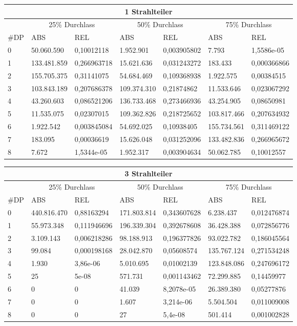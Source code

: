 \begin{tabular}{|l|l|l|l|l|l|l|}
	\hline
	\multicolumn{7}{|c|}{1 Strahlteiler} \\\hline
	&\multicolumn{2}{|c|}{25\% Durchlass}&\multicolumn{2}{c|}{50\% Durchlass}&\multicolumn{2}{c|}{75\% Durchlass}\\\hline
	\#DP & ABS & REL  & ABS & REL & ABS & REL \\\hline
	0&50.060.590&0,10012118&1.952.901&0,003905802&7.793&1,5586e-05\\
	1&133.481.859&0,266963718&15.621.636&0,031243272&183.433&0,000366866\\
	2&155.705.375&0,31141075&54.684.469&0,109368938&1.922.575&0,00384515\\
	3&103.843.189&0,207686378&109.374.310&0,21874862&11.533.646&0,023067292\\
	4&43.260.603&0,086521206&136.733.468&0,273466936&43.254.905&0,08650981\\
	5&11.535.075&0,02307015&109.362.826&0,218725652&103.817.466&0,207634932\\
	6&1.922.542&0,003845084&54.692.025&0,10938405&155.734.561&0,311469122\\
	7&183.095&0,00036619&15.626.048&0,031252096&133.482.836&0,266965672\\
	8&7.672&1,5344e-05&1.952.317&0,003904634&50.062.785&0,10012557\\
	\hline
\end{tabular}

\begin{tabular}{|l|l|l|l|l|l|l|}
	\hline
	\multicolumn{7}{|c|}{3 Strahlteiler} \\\hline
	&\multicolumn{2}{|c|}{25\% Durchlass}&\multicolumn{2}{c|}{50\% Durchlass}&\multicolumn{2}{c|}{75\% Durchlass}\\\hline
	\#DP & ABS & REL  & ABS & REL & ABS & REL \\\hline
	0&440.816.470&0,88163294&171.803.814&0,343607628&6.238.437&0,012476874\\
	1&55.973.348&0,111946696&196.339.304&0,392678608&36.428.388&0,072856776\\
	2&3.109.143&0,006218286&98.188.913&0,196377826&93.022.782&0,186045564\\
	3&99.084&0,000198168&28.042.870&0,05608574&135.767.124&0,271534248\\
	4&1.930&3,86e-06&5.010.695&0,01002139&123.848.086&0,247696172\\
	5&25&5e-08&571.731&0,001143462&72.299.885&0,14459977\\
	6&0&0&41.039&8,2078e-05&26.389.380&0,05277876\\
	7&0&0&1.607&3,214e-06&5.504.504&0,011009008\\
	8&0&0&27&5,4e-08&501.414&0,001002828\\
	\hline
\end{tabular}

